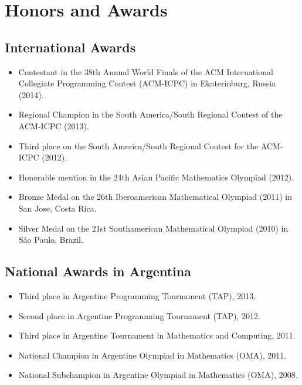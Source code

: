 \documentclass [a4paper, 11pt]{article}
\newcommand{\MACRO}[2]{\newcommand{#1}{#2\xspace}}
\begin{document}
\section* {Honors and Awards}


\subsection* {International Awards}

\begin{itemize} \itemsep.05cm
	\item[] Contestant in the 38th Annual World Finals of the ACM International Collegiate Programming Contest (ACM-ICPC) in Ekaterinburg, Russia (2014).
	\item[] Regional Champion in the South America/South Regional Contest of the ACM-ICPC (2013).
	\item[] Third place on the South America/South Regional Contest for the ACM-ICPC (2012).
	\item[] Honorable mention in the 24th Asian Pacific Mathematics Olympiad (2012).
	\item[] Bronze Medal on the 26th Iberoamerican Mathematical Olympiad (2011) in San Jose, Costa Rica.
	\item[] Silver Medal on the 21st Southamerican Mathematical Olympiad (2010) in S\~ao Paulo, Brazil. %


\end{itemize}

\subsection* {National Awards in Argentina}

\begin{itemize} \itemsep.05cm
	\item[] Third place in Argentine Programming Tournament (TAP), 2013.
	\item[] Second place in Argentine Programming Tournament (TAP), 2012.
	\item[] Third place in Argentine Tournament in Mathematics and Computing, 2011.
	\item[] National Champion in Argentine Olympiad in Mathematics (OMA), 2011.
	\item[] National Subchampion in Argentine Olympiad in Mathematics (OMA), 2008.
	
\end{itemize}
\end{document}
